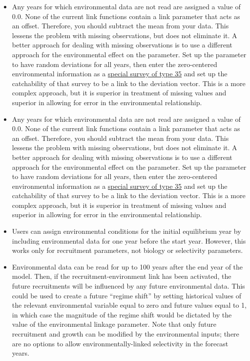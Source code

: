 	\begin{itemize}
		\item Any years for which environmental data are not read are assigned a value of 0.0. None of the current link functions contain a link parameter that acts as an offset. Therefore, you should subtract the mean from your data. This lessens the problem with missing observations, but does not eliminate it. A better approach for dealing with missing observations is to use a different approach for the environmental effect on the parameter. Set up the parameter to have random deviations for all years, then enter the zero-centered environmental information as a \hyperlink{SpecialSurvey}{special survey of type 35} and set up the catchability of that survey to be a link to the deviation vector. This is a more complex approach, but it is superior in treatment of missing values and superior in allowing for error in the environmental relationship.
		\item Any years for which environmental data are not read are assigned a value of 0.0. None of the current link functions contain a link parameter that acts as an offset. Therefore, you should subtract the mean from your data. This lessens the problem with missing observations, but does not eliminate it. A better approach for dealing with missing observations is to use a different approach for the environmental effect on the parameter. Set up the parameter to have random deviations for all years, then enter the zero-centered environmental information as a \hyperlink{SpecialSurvey}{special survey of type 35} and set up the catchability of that survey to be a link to the deviation vector. This is a more complex approach, but it is superior in treatment of missing values and superior in allowing for error in the environmental relationship.
		\item Users can assign environmental conditions for the initial equilibrium year by including environmental data for one year before the start year. However, this works only for recruitment parameters, not biology or selectivity parameters.
		\item Environmental data can be read for up to 100 years after the end year of the model. Then, if the recruitment-environment link has been activated, the future recruitments will be influenced by any future environmental data. This could be used to create a future ``regime shift'' by setting historical values of the relevant environmental variable equal to zero and future values equal to 1, in which case the magnitude of the regime shift would be dictated by the value of the environmental linkage parameter. Note that only future recruitment and growth can be modified by the environmental inputs; there are no options to allow environmentally-linked selectivity in the forecast years.
	\end{itemize}

